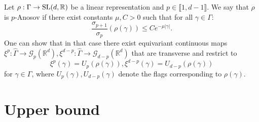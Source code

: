 \documentclass{report}
\begin{document}
\begin{definition}
Let $\rho: \Gamma \to \operatorname{{\mathrm{SL}}}(d, \mathbb R)$ be a linear representation and $p \in \llbracket 1, d-1 \rrbracket$.
We say that $\rho$ is $p$-Anosov if there exist constants $\mu, C>0$ such that for all $\gamma \in \Gamma$:
\[
    \frac{\sigma_{p+1}}{\sigma_p}(\rho(\gamma)) \leq C e^{-\mu |\gamma|}.
\]
One can show that in that case there exist equivariant continuous maps $\xi^p: \hat \Gamma \to \mathcal G_p(\mathbb R^d) , \xi^{d-p}: \hat \Gamma \to \mathcal G_{d-p}(\mathbb R^d)$ that are transverse and restrict to
\[
    \xi^p(\gamma) = U_p(\rho(\gamma)), \xi^{d-p}(\gamma) = U_{d-p}(\rho(\gamma))
\]
for $\gamma \in \Gamma$, where $U_p(\gamma), U_{d-p}(\gamma)$ denote the flags 
corresponding to  $\rho(\gamma)$.
\end{definition}
\chapter{Upper bound}
\end{document}
